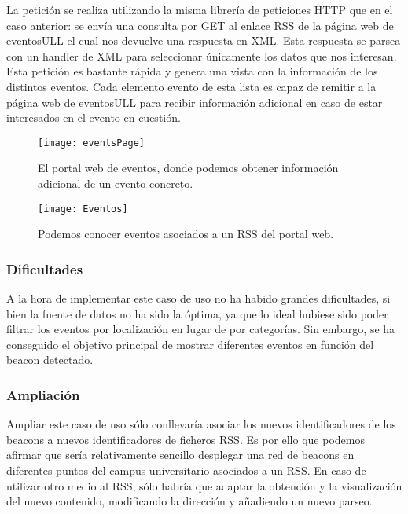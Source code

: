 La petición se realiza utilizando la misma librería de peticiones HTTP que en el caso anterior: se envía una consulta por GET al enlace RSS de la página web de eventosULL el cual nos devuelve una respuesta en XML. Esta respuesta se parsea con un handler de XML para seleccionar únicamente los datos que nos interesan. Esta petición es bastante rápida y genera una vista con la información de los distintos eventos. Cada elemento evento de esta lista es capaz de remitir a la página web de eventosULL para recibir información adicional en caso de estar interesados en el evento en cuestión.

\begin{figure}[H]
	\centering
	\texttt{[image: eventsPage]}
	\caption{El portal web de eventos, donde podemos obtener información adicional de un evento concreto.}
	\label{fig:eventsPage}
\end{figure}

\begin{figure}[H]
	\centering
	\texttt{[image: Eventos]}
	\caption{Podemos conocer eventos asociados a un RSS del portal web.}
	\label{fig:eventos}
\end{figure}

\subsubsection{Dificultades}


A la hora de implementar este caso de uso no ha habido grandes dificultades, si bien la fuente de datos no ha sido la óptima, ya que lo ideal hubiese sido poder filtrar los eventos por localización en lugar de por categorías. Sin embargo, se ha conseguido el objetivo principal de mostrar diferentes eventos en función del beacon detectado.

\subsubsection{Ampliación}


Ampliar este caso de uso sólo conllevaría asociar los nuevos identificadores de los beacons a nuevos identificadores de ficheros RSS. Es por ello que podemos afirmar que sería relativamente sencillo desplegar una red de beacons en diferentes puntos del campus universitario asociados a un RSS. En caso de utilizar otro medio al RSS, sólo habría que adaptar la obtención y la visualización del nuevo contenido, modificando la dirección y añadiendo un nuevo parseo.


